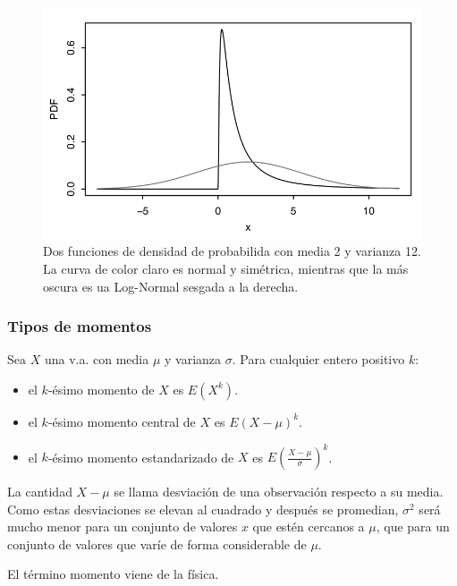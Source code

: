 \begin{figure}[h!]
  \centering
  \includegraphics[scale=0.5]{../slides/figures/dispersion.png}
  \caption{Dos funciones de densidad de probabilida con media 2 y varianza 12. La
  curva de color claro es normal y simétrica, mientras que la más oscura es ua
  Log-Normal sesgada a la derecha.}
\end{figure}

\subsubsection{Tipos de momentos}

Sea $X$ una v.a. con media $\mu$ y varianza $\sigma$. Para cualquier entero
positivo $k$:

\begin{itemize}
  \item el $k$-ésimo momento de $X$ es $E(X^k)$.
  \item el $k$-ésimo momento central de $X$ es $E(X-\mu)^k$.
  \item el $k$-ésimo momento estandarizado de $X$ es $E(\frac{X-\mu}{\sigma})^k$.
\end{itemize}

La cantidad $X-\mu$ se llama desviación de una observación respecto a su media.
Como estas desviaciones se elevan al cuadrado y después se promedian, $\sigma^2$
será mucho menor para un conjunto de valores $x$ que estén cercanos a $\mu$, que
para un conjunto de valores que varíe de forma considerable de $\mu$.

El término momento viene de la física. 
  
